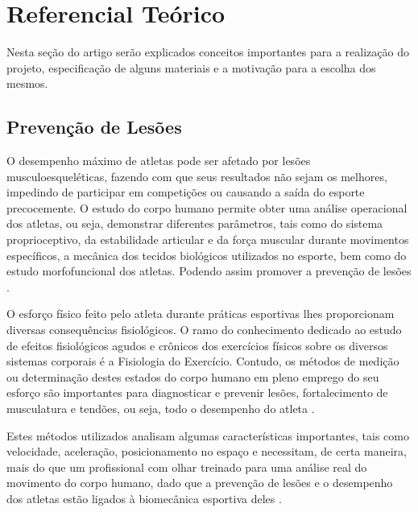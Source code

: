 
\chapter[Referencial Teórico]{Referencial Teórico}
Nesta seção do artigo serão explicados conceitos importantes para a realização do projeto, especificação de alguns materiais e a motivação para a escolha dos mesmos.  

\section{Prevenção de Lesões}

O desempenho máximo de atletas pode ser afetado por lesões musculoesqueléticas, fazendo com que seus resultados não sejam os melhores, impedindo de participar em competições ou causando a saída do esporte precocemente. O estudo do corpo humano permite obter uma análise operacional dos atletas, ou seja, demonstrar diferentes parâmetros, tais como do sistema proprioceptivo, da estabilidade articular e da força muscular durante movimentos específicos, a mecânica dos tecidos biológicos utilizados no esporte, bem como do estudo morfofuncional dos atletas. Podendo assim promover a prevenção de lesões \cite{miziara2014}.  

O esforço físico feito pelo atleta durante práticas esportivas lhes proporcionam diversas consequências fisiológicos. O ramo do conhecimento dedicado ao estudo de efeitos fisiológicos agudos e crônicos dos exercícios físicos sobre os diversos sistemas corporais é a Fisiologia do Exercício. Contudo, os métodos de medição ou determinação destes estados do corpo humano em pleno emprego do seu esforço são importantes para diagnosticar e prevenir lesões, fortalecimento de musculatura e tendões, ou seja, todo o desempenho do atleta \cite{rocha2005}.

Estes métodos utilizados analisam algumas características importantes, tais como velocidade, aceleração, posicionamento no espaço e necessitam, de certa maneira, mais do que um profissional com olhar treinado para uma análise real do movimento do corpo humano, dado que a prevenção de lesões e o desempenho dos atletas estão ligados à biomecânica esportiva deles \cite{amadio2000}.

